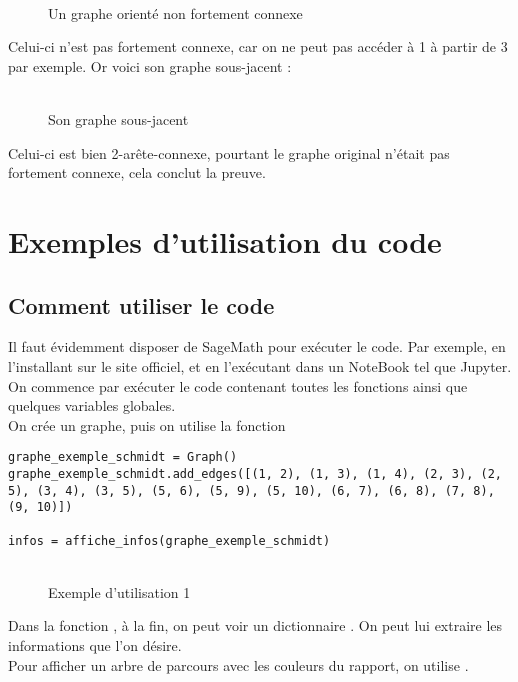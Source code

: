 \documentclass{article}      %
\begin{document}
\begin{figure}[H]
    \centering
    \\Un graphe orienté non fortement connexe
\end{figure}

Celui-ci n'est pas fortement connexe, car on ne peut pas accéder à 1 à partir de 3 par exemple.
Or voici son graphe sous-jacent :
\begin{figure}[H]
    \centering
    \\Son graphe sous-jacent
\end{figure}
Celui-ci est bien 2-arête-connexe, pourtant le graphe original n'était pas fortement connexe, cela conclut la preuve.



\section{Exemples d'utilisation du code}
\subsection{Comment utiliser le code}
Il faut évidemment disposer de SageMath pour exécuter le code.
Par exemple, en l'installant sur le site officiel, et en l'exécutant dans un NoteBook tel que Jupyter.
%
\\ On commence par exécuter le code contenant toutes les fonctions ainsi que quelques variables globales.
%
\\ On crée un graphe, puis on utilise la fonction 

\begin{lstlisting}[style=code-style]
graphe_exemple_schmidt = Graph()
graphe_exemple_schmidt.add_edges([(1, 2), (1, 3), (1, 4), (2, 3), (2, 5), (3, 4), (3, 5), (5, 6), (5, 9), (5, 10), (6, 7), (6, 8), (7, 8), (9, 10)])

infos = affiche_infos(graphe_exemple_schmidt)
\end{lstlisting}

\begin{figure}[H]
    \centering
    \\Exemple d'utilisation 1
\end{figure}

Dans la fonction , à la fin, on peut voir un dictionnaire .
On peut lui extraire les informations que l'on désire.
%
\\ Pour afficher un arbre de parcours avec les couleurs du rapport, on utilise .
\end{document}
